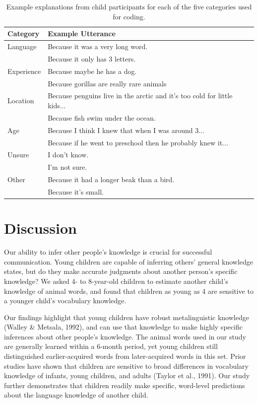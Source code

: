 \documentclass[10pt, letterpaper]{article}
\begin{document}
\begin{table}[tb]
\centering
\begin{tabular}{ll}
  \hline
Category & Example Utterance \\ 
  \hline
Language & Because it was a very long word. \\ 
    & Because it only has 3 letters. \\ 
  Experience & Because maybe he has a dog. \\ 
    & Because gorillas are really rare animals \\ 
  Location & Because penguins live in the arctic and it's too cold for little kids... \\ 
    & Because fish swim under the ocean. \\ 
  Age & Because I think I knew that when I was around 3... \\ 
    & Because if he went to preschool then he probably knew it... \\ 
  Unsure & I don't know. \\ 
    & I'm not sure. \\ 
  Other & Because it had a longer beak than a bird. \\ 
    & Because it's small. \\ 
   \hline
\end{tabular}
\caption{Example explanations from child participants for each of the five categories used for coding.} 
\label{tab:explanations_table}
\end{table}

\hypertarget{discussion}{%
\section{Discussion}\label{discussion}}

Our ability to infer other people's knowledge is crucial for successful
communication. Young children are capable of inferring others' general
knowledge states, but do they make accurate judgments about another
person's specific knowledge? We asked 4- to 8-year-old children to
estimate another child's knowledge of animal words, and found that
children as young as 4 are sensitive to a younger child's vocabulary
knowledge.

Our findings highlight that young children have robust metalinguistic
knowledge (Walley \& Metsala, 1992), and can use that knowledge to make
highly specific inferences about other people's knowledge. The animal
words used in our study are generally learned within a 6-month period,
yet young children still distinguished earlier-acquired words from
later-acquired words in this set. Prior studies have shown that children
are sensitive to broad differences in vocabulary knowledge of infants,
young children, and adults (Taylor et al., 1991). Our study further
demonstrates that children readily make specific, word-level predictions
about the language knowledge of another child.
\end{document}
